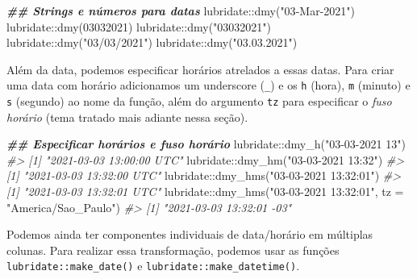 \documentclass[
]{book}
\newenvironment{Shaded}{\begin{snugshade}}{\end{snugshade}}
\newcommand{\AttributeTok}[1]{\textcolor[rgb]{0.61,0.61,0.61}{#1}}
\newcommand{\CommentTok}[1]{\textcolor[rgb]{0.37,0.37,0.37}{\textit{#1}}}
\newcommand{\DecValTok}[1]{\textcolor[rgb]{0.06,0.06,0.06}{#1}}
\newcommand{\DocumentationTok}[1]{\textcolor[rgb]{0.37,0.37,0.37}{\textbf{\textit{#1}}}}
\newcommand{\FunctionTok}[1]{\textcolor[rgb]{0,0,0}{#1}}
\newcommand{\NormalTok}[1]{#1}
\newcommand{\SpecialCharTok}[1]{\textcolor[rgb]{0,0,0}{#1}}
\newcommand{\StringTok}[1]{\textcolor[rgb]{0.5,0.5,0.5}{#1}}
\begin{document}
\begin{Shaded}
\begin{Highlighting}[]
\DocumentationTok{\#\# Strings e números para datas}
\NormalTok{lubridate}\SpecialCharTok{::}\FunctionTok{dmy}\NormalTok{(}\StringTok{"03{-}Mar{-}2021"}\NormalTok{)}
\NormalTok{lubridate}\SpecialCharTok{::}\FunctionTok{dmy}\NormalTok{(}\DecValTok{03032021}\NormalTok{)}
\NormalTok{lubridate}\SpecialCharTok{::}\FunctionTok{dmy}\NormalTok{(}\StringTok{"03032021"}\NormalTok{)}
\NormalTok{lubridate}\SpecialCharTok{::}\FunctionTok{dmy}\NormalTok{(}\StringTok{"03/03/2021"}\NormalTok{)}
\NormalTok{lubridate}\SpecialCharTok{::}\FunctionTok{dmy}\NormalTok{(}\StringTok{"03.03.2021"}\NormalTok{)}
\end{Highlighting}
\end{Shaded}

Além da data, podemos especificar horários atrelados a essas datas. Para criar uma data com horário adicionamos um underscore (\texttt{\_}) e os \texttt{h} (hora), \texttt{m} (minuto) e \texttt{s} (segundo) ao nome da função, além do argumento \texttt{tz} para especificar o \emph{fuso horário} (tema tratado mais adiante nessa seção).

\begin{Shaded}
\begin{Highlighting}[]
\DocumentationTok{\#\# Especificar horários e fuso horário}
\NormalTok{lubridate}\SpecialCharTok{::}\FunctionTok{dmy\_h}\NormalTok{(}\StringTok{"03{-}03{-}2021 13"}\NormalTok{)}
\CommentTok{\#\textgreater{} [1] "2021{-}03{-}03 13:00:00 UTC"}
\NormalTok{lubridate}\SpecialCharTok{::}\FunctionTok{dmy\_hm}\NormalTok{(}\StringTok{"03{-}03{-}2021 13:32"}\NormalTok{)}
\CommentTok{\#\textgreater{} [1] "2021{-}03{-}03 13:32:00 UTC"}
\NormalTok{lubridate}\SpecialCharTok{::}\FunctionTok{dmy\_hms}\NormalTok{(}\StringTok{"03{-}03{-}2021 13:32:01"}\NormalTok{)}
\CommentTok{\#\textgreater{} [1] "2021{-}03{-}03 13:32:01 UTC"}
\NormalTok{lubridate}\SpecialCharTok{::}\FunctionTok{dmy\_hms}\NormalTok{(}\StringTok{"03{-}03{-}2021 13:32:01"}\NormalTok{, }\AttributeTok{tz =} \StringTok{"America/Sao\_Paulo"}\NormalTok{)}
\CommentTok{\#\textgreater{} [1] "2021{-}03{-}03 13:32:01 {-}03"}
\end{Highlighting}
\end{Shaded}

Podemos ainda ter componentes individuais de data/horário em múltiplas colunas. Para realizar essa transformação, podemos usar as funções \texttt{lubridate::make\_date()} e \texttt{lubridate::make\_datetime()}.
\end{document}
